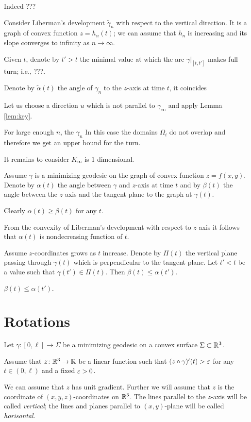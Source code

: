 \documentclass[a4paper,10pt]{amsart}
\begin{document}
\medskip

Indeed ???

Consider Liberman's development $\tilde\gamma_n$ with respect to the vertical direction.
It is a graph of convex function $z=h_n(t)$;
we can assume that $h_n$ is increasing and its slope converges to infinity as $n\to\infty$.

Given $t$, denote by $t'>t$ the minimal value at which the arc $\gamma|_{[t,t']}$ makes full turn; i.e., ???.

Denote by $\tilde\alpha(t)$ the angle of $\gamma_n$ to the $z$-axis at time $t$,
it coincides 


Let us choose a direction $u$ 
which is not parallel to $\gamma_\infty$ and apply Lemma \ref{lem:key}.

For large enough $n$, 
the $\gamma_n$ 
In this case the domains $\Omega_i$ do not overlap and therefore we get an upper bound for the turn.

It remains to consider  $K_\infty$ is 1-dimensional.

Assume $\gamma$ is a minimizing geodesic on the graph of convex function $z=f(x,y)$.
Denote by $\alpha(t)$ the angle between $\gamma$ and $z$-axis at time $t$
and by $\beta(t)$ the angle between the $z$-axis and the tangent plane to the graph at $\gamma(t)$.

Clearly $\alpha(t)\ge \beta(t)$ for any $t$.

From the convexity of Liberman's development with respect to $z$-axis it follows that $\alpha(t)$ is nondecreasing function of $t$.

Assume $z$-coordinates grows as $t$ increase.
Denote by $\Pi(t)$ the vertical plane passing through $\gamma(t)$ which is perpendicular to the tangent plane.
Let $t'<t$ be a value such that $\gamma(t')\in \Pi(t)$.
Then $\beta(t)\le \alpha(t')$.

$\beta(t)\le \alpha(t')$.

\section{Rotations}

Let $\gamma:[0,\ell]\to \Sigma$ be a minimizing geodesic on a convex surface $\Sigma\subset \mathbb{R}^3$.

Assume that $z\colon\mathbb{R}^3\to\mathbb{R}$ be a linear function such that
$(z\circ\gamma)'(t)>\varepsilon$ for any $t\in (0,\ell)$ and a fixed $\varepsilon>0$.

We can assume that $z$ has unit gradient.
Further we will assume that $z$ is the coordinate 
of $(x,y,z)$-coordinates on $\mathbb{R}^3$.
The lines parallel to the $z$-axis will be called \emph{vertical};
the lines and planes parallel to $(x,y)$-plane will be called \emph{horisontal}.
\end{document}
